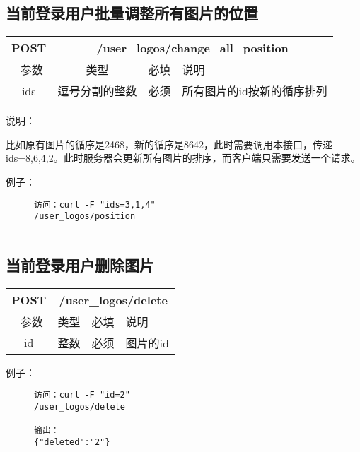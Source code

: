 \subsection{当前登录用户批量调整所有图片的位置}

\begin{table}[H]
   \begin{center}
\begin{tabular}{|c|c|c|p{12cm}|}
\hline
POST & \multicolumn{3}{|c|}{/user\_logos/change\_all\_position} \\
\hline\hline
 \  参数  & 类型 & 必填 &  说明  \\
\hline
 ids  & 逗号分割的整数 & 必须 &  所有图片的id按新的循序排列\\
\hline
\end{tabular}
   \end{center}
\end{table}

说明：

比如原有图片的循序是2468，新的循序是8642，此时需要调用本接口，传递ids=8,6,4,2。此时服务器会更新所有图片的排序，而客户端只需要发送一个请求。

例子：

\begin{figure}[H]
\begin{verbatim}
访问：curl -F "ids=3,1,4" 
/user_logos/position


\end{verbatim}
\end{figure}



\subsection{当前登录用户删除图片}

\begin{table}[H]
   \begin{center}
\begin{tabular}{|c|c|c|p{12cm}|}
\hline
POST & \multicolumn{3}{|c|}{/user\_logos/delete} \\
\hline\hline
 \  参数  & 类型 & 必填 &  说明  \\
\hline
 id  & 整数 & 必须 &  图片的id\\
\hline
\end{tabular}
   \end{center}
\end{table}

例子：

\begin{figure}[H]
\begin{verbatim}
访问：curl -F "id=2" 
/user_logos/delete

输出：
{"deleted":"2"}

\end{verbatim}
\end{figure}


